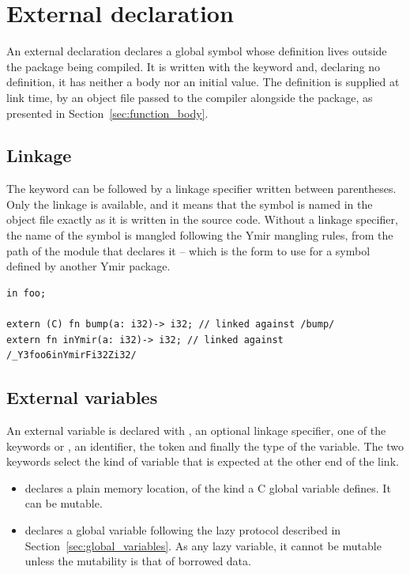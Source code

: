 \section{External declaration}%
\label{sec:extern_var}
\label{sec:external_decls}

An external declaration declares a global symbol whose definition lives outside
the package being compiled. It is written with the keyword  and,
declaring no definition, it has neither a body nor an initial value. The
definition is supplied at link time, by an object file passed to the compiler
alongside the package, as presented in Section~\ref{sec:function_body}.

\subsection{Linkage}

The keyword  can be followed by a linkage specifier written
between parentheses. Only the  linkage is available, and it means that
the symbol is named in the object file exactly as it is written in the source
code. Without a linkage specifier, the name of the symbol is mangled following
the Ymir mangling rules, from the path of the module that declares it -- which
is the form to use for a symbol defined by another Ymir package.

\begin{lstlisting}[style=coloredverbatim]
in foo;

extern (C) fn bump(a: i32)-> i32; // linked against /bump/
extern fn inYmir(a: i32)-> i32; // linked against /_Y3foo6inYmirFi32Zi32/
\end{lstlisting}

\subsection{External variables}

An external variable is declared with , an optional linkage
specifier, one of the keywords  or , an identifier,
the token \token{:} and finally the type of the variable. The two keywords
select the kind of variable that is expected at the other end of the link.

\begin{itemize}
\item {} declares a plain memory location, of the kind a C global
  variable defines. It can be mutable.
\item {} declares a global variable following the lazy protocol
  described in Section~\ref{sec:global_variables}. As any lazy variable, it
  cannot be mutable unless the mutability is that of borrowed data.
\end{itemize}

